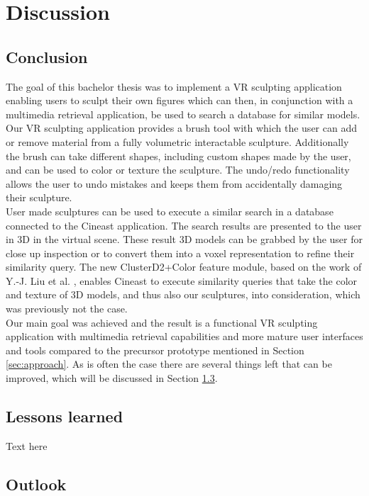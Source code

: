 \chapter{Discussion}

\section{Conclusion}

The goal of this bachelor thesis was to implement a VR sculpting application enabling users to sculpt their own figures which can then, in conjunction with a multimedia retrieval application, be used to search a database for similar models.\\
Our VR sculpting application provides a brush tool with which the user can add or remove material from a fully volumetric interactable sculpture. Additionally the brush can take different shapes, including custom shapes made by the user, and can be used to color or texture the sculpture. The undo/redo functionality allows the user to undo mistakes and keeps them from accidentally damaging their sculpture.\\
User made sculptures can be used to execute a similar search in a database connected to the Cineast application. The search results are presented to the user in 3D in the virtual scene. These result 3D models can be grabbed by the user for close up inspection or to convert them into a voxel representation to refine their similarity query. The new ClusterD2+Color feature module, based on the work of Y.-J. Liu et al. \cite{cluster_d2_color}, enables Cineast to execute similarity queries that take the color and texture of 3D models, and thus also our sculptures, into consideration, which was previously not the case.\\
Our main goal was achieved and the result is a functional VR sculpting application with multimedia retrieval capabilities and more mature user interfaces and tools compared to the precursor prototype mentioned in Section \ref{sec:approach}. As is often the case there are several things left that can be improved, which will be discussed in Section \ref{sec:future_work}.


\section{Lessons learned}

Text here

\section{Outlook}
\label{sec:future_work}

